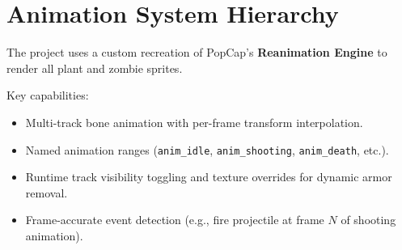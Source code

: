 \documentclass[12pt,a4paper]{article}
\begin{document}
\section{Animation System Hierarchy}
The project uses a custom recreation of PopCap's \textbf{Reanimation Engine} to render all plant and zombie sprites.
\begin{center}
\end{center}
\noindent Key capabilities:
\begin{itemize}[leftmargin=2em]
    \item Multi-track bone animation with per-frame transform interpolation.
    \item Named animation ranges (\texttt{anim\_idle}, \texttt{anim\_shooting}, \texttt{anim\_death}, etc.).
    \item Runtime track visibility toggling and texture overrides for dynamic armor removal.
    \item Frame-accurate event detection (e.g., fire projectile at frame $N$ of shooting animation).
\end{itemize}
\end{document}
